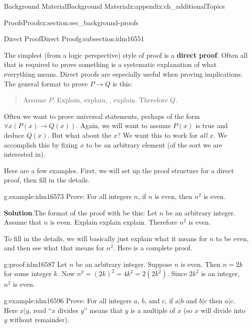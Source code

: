 \documentclass[oneside,10pt,]{book}
\newcommand{\terminology}[1]{\textbf{#1}}
\numberwithin{equation}{chapter}
\def\imp{\rightarrow}
\begin{document}
\begin{appendixptx}{Background Material}{}{Background Material}{}{}{x:appendix:ch_additionalTopics}
\begin{sectionptx}{Proofs}{}{Proofs}{}{}{x:section:sec_background-proofs}
\begin{introduction}{}
\end{introduction}%
%
%
\typeout{************************************************}
\typeout{************************************************}
%
\begin{subsectionptx}{Direct Proof}{}{Direct Proof}{}{}{g:subsection:idm16551}
%
\par
The simplest (from a logic perspective) style of proof is a \terminology{direct proof}. Often all that is required to prove something is a systematic explanation of what everything means. Direct proofs are especially useful when proving implications. The general format to prove \(P \imp Q\) is this:%
\begin{quote}%
Assume \(P\). Explain, explain, \textellipsis{}, explain. Therefore \(Q\).%
\end{quote}
Often we want to prove universal statements, perhaps of the form \(\forall x (P(x) \imp Q(x))\). Again, we will want to assume \(P(x)\) is true and deduce \(Q(x)\). But what about the \(x\)? We want this to work for \emph{all} \(x\). We accomplish this by fixing \(x\) to be an arbitrary element (of the sort we are interested in).%
\par
Here are a few examples. First, we will set up the proof structure for a direct proof, then fill in the details.%
\begin{example}{}{g:example:idm16573}%
Prove: For all integers \(n\), if \(n\) is even, then \(n^2\) is even.%
\par\smallskip%
\noindent\textbf{Solution}.\hypertarget{g:solution:idm16579}{}\quad{}The format of the proof with be this: Let \(n\) be an arbitrary integer. Assume that \(n\) is even. Explain explain explain. Therefore \(n^2\) is even.%
\par
To fill in the details, we will basically just explain what it means for \(n\) to be even, and then see what that means for \(n^2\). Here is a complete proof.%
\begin{proofptx}{}{g:proof:idm16587}
Let \(n\) be an arbitrary integer. Suppose \(n\) is even. Then \(n = 2k\) for some integer \(k\). Now \(n^2 = (2k)^2 = 4k^2 = 2(2k^2)\). Since \(2k^2\) is an integer, \(n^2\) is even.%
\end{proofptx}
\end{example}
\begin{example}{}{g:example:idm16596}%
Prove: For all integers \(a\), \(b\), and \(c\), if \(a|b\) and \(b|c\) then \(a|c\). Here \(x|y\), read ``\(x\) divides \(y\)'' means that \(y\) is a multiple of \(x\) (so \(x\) will divide into \(y\) without remainder).%

\end{example}
\end{subsectionptx}
\end{sectionptx}
\end{appendixptx}
\end{document}
